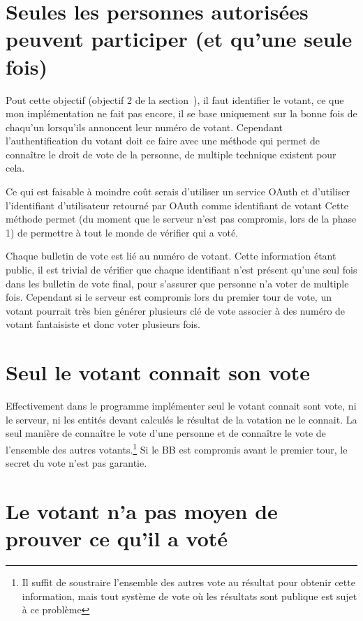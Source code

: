 \documentclass[../report]{subfiles}
\begin{document}
\section{Seules les personnes autorisées peuvent participer (et qu'une seule fois)}

Pout cette objectif (objectif 2 de la section~),
il faut identifier le votant, ce que mon implémentation ne fait pas encore, il se base 
uniquement sur la bonne fois de chaqu'un lorsqu'ils annoncent leur numéro de votant.
Cependant l'authentification du votant doit ce faire avec une méthode qui permet de connaître
le droit de vote de la personne, de multiple technique existent pour cela.

Ce qui est faisable à moindre coût serais d'utiliser un service OAuth et d'utiliser l'identifiant
d'utilisateur retourné par OAuth comme identifiant de votant
Cette méthode permet (du moment que le serveur n'est pas compromis, lors de la phase 1) de permettre
à tout le monde de vérifier qui a voté.

Chaque bulletin de vote est lié au numéro de votant. 
Cette information étant public, il est trivial de vérifier que chaque identifiant n'est présent
qu'une seul fois dans les bulletin de vote final, pour s'assurer que personne n'a voter de 
multiple fois.
Cependant si le serveur est compromis lors du premier tour de vote, un votant pourrait très bien
générer plusieurs clé de vote associer à des numéro de votant fantaisiste et donc voter 
plusieurs fois.

\section{Seul le votant connait son vote}

Effectivement dans le programme implémenter seul le votant connait sont vote, ni le serveur, 
ni les entités devant calculés le résultat de la votation ne le connait.
La seul manière de connaître le vote d'une personne et de connaître le vote de l'ensemble 
des autres votants.\footnote{Il suffit de soustraire l'ensemble des autres vote au résultat
pour obtenir cette information, mais tout système de vote où les résultats sont publique est
sujet à ce problème}
Si le BB est compromis avant le premier tour, le secret du vote n'est pas garantie.

\section{Le votant n'a pas moyen de prouver ce qu'il a voté}
\end{document}
